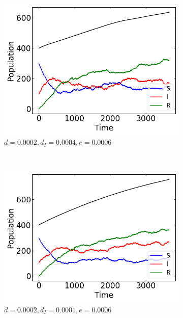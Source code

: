 \begin{figure}[H]
    \centering
    \begin{subfigure}{0.49\textwidth}
        \centering
        \includegraphics[width=\linewidth]{../fig/texfig/MC_vitaldynamic_d0002_dI0004_e0006.png}
        \caption{$d = 0.0002, d_I = 0.0004, e = 0.0006$}
    \end{subfigure}
     ~ 
    \begin{subfigure}{0.49\textwidth}
         \centering
         \includegraphics[width=\linewidth]{../fig/texfig/MC_vitaldynamic_d00002_dI0001_e00006.png}
         \caption{$d = 0.0002, d_I = 0.0001, e = 0.0006$}
    \end{subfigure}
     ~ 
    \begin{subfigure}{0.49\textwidth}

\end{subfigure}
\end{figure}
